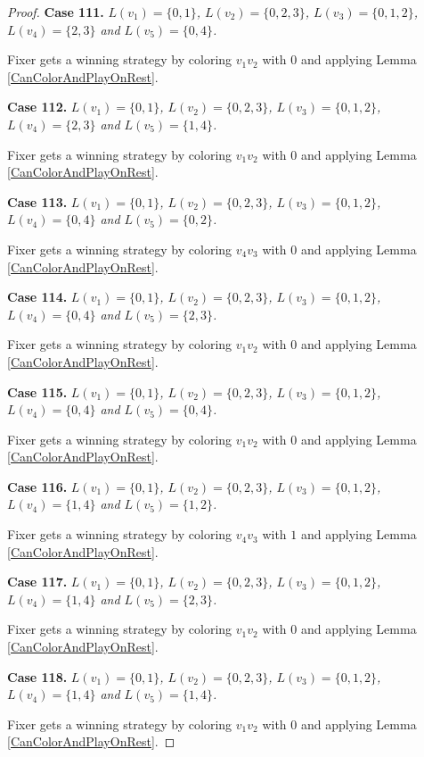 \documentclass[12pt]{amsart}
\theoremstyle{plain}
\theoremstyle{definition}
\theoremstyle{remark}
\begin{document}
\begin{proof}
\noindent\textbf{Case 111.  }\textit{$L(v_1) = \{0, 1\}$, $L(v_2) = \{0, 2, 3\}$, $L(v_3) = \{0, 1, 2\}$, $L(v_4) = \{2, 3\}$ and $L(v_5) = \{0, 4\}$.}

Fixer gets a winning strategy by coloring $v_1v_2$ with $0$ and applying Lemma \ref{CanColorAndPlayOnRest}.

\noindent\textbf{Case 112.  }\textit{$L(v_1) = \{0, 1\}$, $L(v_2) = \{0, 2, 3\}$, $L(v_3) = \{0, 1, 2\}$, $L(v_4) = \{2, 3\}$ and $L(v_5) = \{1, 4\}$.}

Fixer gets a winning strategy by coloring $v_1v_2$ with $0$ and applying Lemma \ref{CanColorAndPlayOnRest}.

\noindent\textbf{Case 113.  }\textit{$L(v_1) = \{0, 1\}$, $L(v_2) = \{0, 2, 3\}$, $L(v_3) = \{0, 1, 2\}$, $L(v_4) = \{0, 4\}$ and $L(v_5) = \{0, 2\}$.}

Fixer gets a winning strategy by coloring $v_4v_3$ with $0$ and applying Lemma \ref{CanColorAndPlayOnRest}.

\noindent\textbf{Case 114.  }\textit{$L(v_1) = \{0, 1\}$, $L(v_2) = \{0, 2, 3\}$, $L(v_3) = \{0, 1, 2\}$, $L(v_4) = \{0, 4\}$ and $L(v_5) = \{2, 3\}$.}

Fixer gets a winning strategy by coloring $v_1v_2$ with $0$ and applying Lemma \ref{CanColorAndPlayOnRest}.

\noindent\textbf{Case 115.  }\textit{$L(v_1) = \{0, 1\}$, $L(v_2) = \{0, 2, 3\}$, $L(v_3) = \{0, 1, 2\}$, $L(v_4) = \{0, 4\}$ and $L(v_5) = \{0, 4\}$.}

Fixer gets a winning strategy by coloring $v_1v_2$ with $0$ and applying Lemma \ref{CanColorAndPlayOnRest}.

\noindent\textbf{Case 116.  }\textit{$L(v_1) = \{0, 1\}$, $L(v_2) = \{0, 2, 3\}$, $L(v_3) = \{0, 1, 2\}$, $L(v_4) = \{1, 4\}$ and $L(v_5) = \{1, 2\}$.}

Fixer gets a winning strategy by coloring $v_4v_3$ with $1$ and applying Lemma \ref{CanColorAndPlayOnRest}.

\noindent\textbf{Case 117.  }\textit{$L(v_1) = \{0, 1\}$, $L(v_2) = \{0, 2, 3\}$, $L(v_3) = \{0, 1, 2\}$, $L(v_4) = \{1, 4\}$ and $L(v_5) = \{2, 3\}$.}

Fixer gets a winning strategy by coloring $v_1v_2$ with $0$ and applying Lemma \ref{CanColorAndPlayOnRest}.

\noindent\textbf{Case 118.  }\textit{$L(v_1) = \{0, 1\}$, $L(v_2) = \{0, 2, 3\}$, $L(v_3) = \{0, 1, 2\}$, $L(v_4) = \{1, 4\}$ and $L(v_5) = \{1, 4\}$.}

Fixer gets a winning strategy by coloring $v_1v_2$ with $0$ and applying Lemma \ref{CanColorAndPlayOnRest}.


\end{proof}
\end{document}
